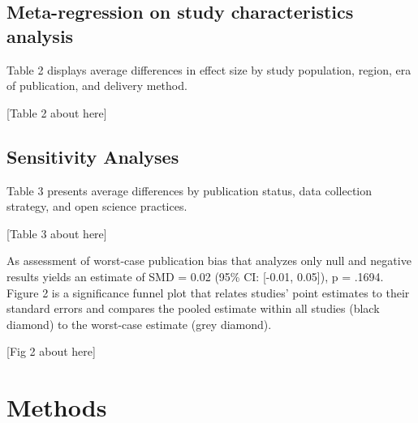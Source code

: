 \documentclass[sn-nature,referee,pdflatex]{sn-jnl}
\begin{document}
\subsection{Meta-regression on study characteristics
analysis}\label{sec2.4}

Table 2 displays average differences in effect size by study population,
region, era of publication, and delivery method.

\begin{center}
[Table 2 about here]
\end{center}

\subsection{Sensitivity Analyses}\label{sec2.5}

Table 3 presents average differences by publication status, data
collection strategy, and open science practices.

\begin{center}
[Table 3 about here]
\end{center}

\begin{comment}
The meta-analytic mean corrected for publication bias [@hedges1992], which assumes that significant, positive results are twice as likely to be published as anything else, is SMD = r pub_bias_estimate (95%
\end{comment}

As assessment of worst-case publication bias that analyzes only null and
negative results \citep{mathur2024} yields an estimate of SMD = 0.02
(95\% CI: {[}-0.01, 0.05{]}), p = .1694. Figure 2 is a significance
funnel plot \citep{mathur2020} that relates studies' point estimates to
their standard errors and compares the pooled estimate within all
studies (black diamond) to the worst-case estimate (grey diamond).

\begin{center}
[Fig 2 about here]
\end{center}
\begin{comment}
should this be a supplementary fig?
\end{comment}

\section{Methods}\label{sec3}
\end{document}
